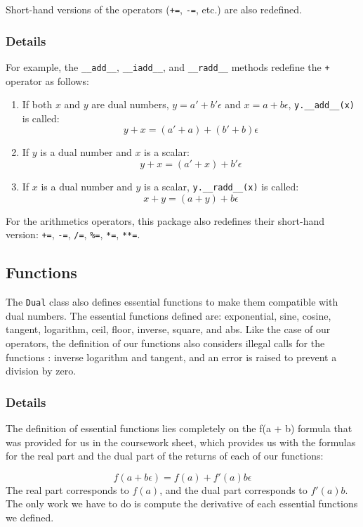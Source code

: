 \documentclass[a4paper,12pt]{article}
\begin{document}
Short-hand versions of the operators (\texttt{+=}, \texttt{-=}, etc.) are also redefined.

\subsubsection{Details}
For example, the \texttt{\_\_add\_\_}, \texttt{\_\_iadd\_\_}, and \texttt{\_\_radd\_\_} methods redefine the \texttt{+} operator as follows:
\begin{enumerate}
    \item If both $x$ and $y$ are dual numbers, $y = a' + b'\epsilon$ and $x = a + b\epsilon$, \texttt{y.\_\_add\_\_(x)} is called:
    \[
    y + x = (a' + a) + (b' + b)\epsilon
    \]
    \item If $y$ is a dual number and $x$ is a scalar:
    \[
    y + x = (a' + x) + b'\epsilon
    \]
    \item If $x$ is a dual number and $y$ is a scalar, \texttt{y.\_\_radd\_\_(x)} is called:
    \[
    x + y = (a + y) + b\epsilon
    \]
\end{enumerate}

For the arithmetics operators, this package also redefines their short-hand version: \texttt{+=}, \texttt{-=}, \texttt{/=}, \texttt{\%=}, \texttt{*=}, \texttt{**=}.

\subsection{Functions}
The \texttt{Dual} class also defines essential functions to make them compatible with dual numbers. The essential functions defined are: exponential, sine, cosine, tangent, logarithm, ceil, floor, inverse, square, and abs.
Like the case of our operators, the definition of our functions also considers illegal calls for the functions : inverse logarithm and tangent, and an error is raised to prevent a division by zero.

\subsubsection{Details}
The definition of essential functions lies completely on the f(a + b\epsilon\)) formula that was provided for us in the coursework sheet, which provides us with the formulas for the real part and the dual part of the returns of each of our functions:

\[
f(a + b\epsilon) = f(a) + f'(a)b\epsilon
\]
The real part corresponds to $f(a)$, and the dual part corresponds to $f'(a)b$.
The only work we have to do is compute the derivative of each essential functions we defined.
\end{document}

